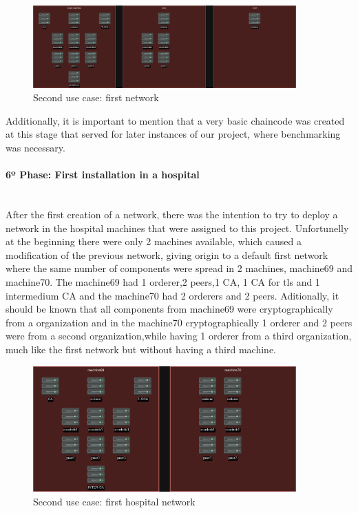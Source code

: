 \begin{figure}[H]
    \centering
    \includegraphics[width=0.9\textwidth]{assets/use-case-2/default-first-netwrk.drawio.png} %
    \caption{Second use case: first network}
    \label{fig:sample-image} 
\end{figure}

Additionally, it is important to mention that a very basic chaincode was created at this stage that served for later instances of our project, where benchmarking was necessary.

\paragraph{6º Phase: First installation in a hospital}\mbox{}\\

After the first creation of a network, there was the intention to try to deploy a network in the hospital machines that were assigned to this project. Unfortunelly at the beginning there were only 2 machines available, which caused a modification of the previous network, giving origin to a default first network where the same number of components were spread in 2 machines, machine69 and machine70. The machine69 had 1 orderer,2 peers,1 CA, 1 CA for tls and 1 intermedium CA and the machine70 had 2 orderers and 2 peers. Aditionally, it should be known that all components from machine69 were cryptographically from a organization and in the machine70 cryptographically 1 orderer and 2 peers were from a second organization,while having 1 orderer from a third organization, much like the first network but without having a third machine.
\begin{figure}[H]
    \centering
    \includegraphics[width=0.9\textwidth]{assets/use-case-2/default-first-hospital.drawio.png} %
    \caption{Second use case: first hospital network}
    \label{fig:sample-image} 
\end{figure}

